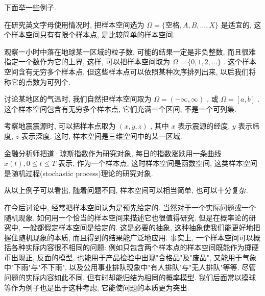 \documentclass[../../main.tex]{subfiles}
\begin{document}
下面举一些例子. 

\begin{example}
    在研究英文字母使用情况时, 把样本空间选为 $\Omega=\{空格, A, B, ..., X\}$ 是适宜的, 这个样本空间只有有限个样本点, 是比较简单的样本空间. 
    \label{exp:1.2.1}
\end{example}

\begin{example}
    观察一小时中落在地球某一区域的粒子数, 可能的结果一定是非负整数, 而且很难指定一个数作为它的上界, 这样, 可以把样本空间取为 $\Omega=\{0, 1, 2, ...\}$ . 这个样本空间含有无穷多个样本点, 但这些样本点可以依照某种次序排列出来, 以后我们将称它的点数为可列个. 
\end{example}

\begin{example}
    讨论某地区的气温时, 我们自然把样本空间取为 $\Omega=(-\infty, \infty)$ , 或 $\Omega=[a, b]$ . 这个样本空间包含有无穷多个样本点, 它们充满一个区间, 不是一个可列集. 
\end{example}

\begin{example}
    考察地震震源时, 可以把样本点取为 $(x, y, z)$ , 其中 $x$ 表示震源的经度, $y$ 表示纬度, $z$ 表示深度. 这时, 样本空间是三维空间中的某一区域. 
\end{example}

\begin{example}
    金融分析师把道·琼斯指数作为研究对象, 每日的指数涨跌用一条曲线 $x(t), 0\leq t\leq T$ 表示, 作为一个样本点, 这时样本空间是函数空间, 这类样本空间是随机过程(stochastic process)理论的研究对象. 
\end{example}

从以上例子可以看出, 随着问题不同, 样本空间可以相当简单, 也可以十分复杂. 

在今后讨论中, 经常把样本空间认为是预先给定的. 当然对于一个实际问题或一个随机现象, 如何用一个恰当的样本空间来描述它也很值得研究. 但是在概率论的研究中, 一般都假定样本空间是给定的.  这是必要的抽象, 这种抽象使我们能更好地把握住随机现象的本质, 而且得到的结果能广泛地应用. 事实上, 一个样本空间可以概括各种实际内容很不相同的问题: 例如只包含两个样本点的样本空间既能作为掷硬币出现正, 反面的模型, 也能用于产品检验中出现"合格品"及"废品", 又能用于气象中"下雨"与"不下雨", 以及公用事业排队现象中"有人排队"与"无人排队"等等. 尽管问题的实际内容如此不同, 但有时却能归结为相同的概率模型. 我们后面常以摸球等作为例子也是出于这种考虑, 它能使问题的本质更为突出. 
\end{document}
